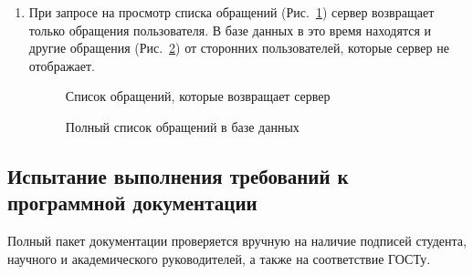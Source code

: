\documentclass{../includes/TechDoc}
\begin{document}
\begin{enumerate}
        \item При запросе на просмотр списка обращений (Рис.~\ref{ris:api_problem_list}) сервер возвращает только обращения пользователя.
        В базе данных в это время находятся и другие обращения (Рис.~\ref{ris:api_full_problem_list}) от сторонних пользователей, которые сервер не отображает.
        \begin{figure}[h]
            \centering
            \caption{Список обращений, которые возвращает сервер}
            \label{ris:api_problem_list}
        \end{figure}
        \begin{figure}[h]
            \centering
            \caption{Полный список обращений в базе данных}
            \label{ris:api_full_problem_list}
        \end{figure}
    \end{enumerate}

    \clearpage

    \subsection{Испытание выполнения требований к программной документации}

    Полный пакет документации проверяется вручную на наличие подписей студента, научного и академического руководителей, а также на соответствие ГОСТу.
\end{document}
